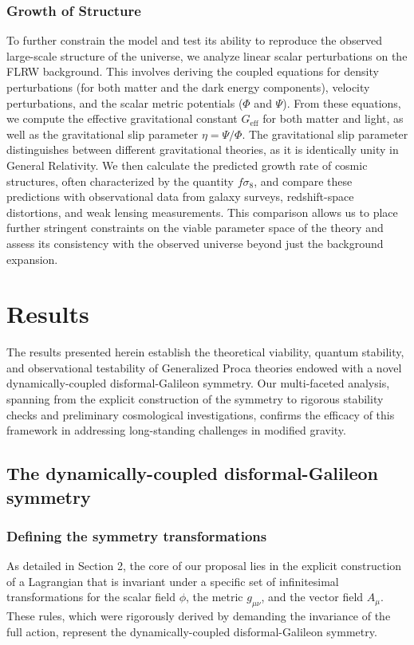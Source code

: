 \documentclass[twocolumn]{aastex631}
\begin{document}
\subsubsection{Growth of Structure}
To further constrain the model and test its ability to reproduce the observed large-scale structure of the universe, we analyze linear scalar perturbations on the FLRW background. This involves deriving the coupled equations for density perturbations (for both matter and the dark energy components), velocity perturbations, and the scalar metric potentials ($\Phi$ and $\Psi$). From these equations, we compute the effective gravitational constant $G_{\text{eff}}$ for both matter and light, as well as the gravitational slip parameter $\eta = \Psi/\Phi$. The gravitational slip parameter distinguishes between different gravitational theories, as it is identically unity in General Relativity. We then calculate the predicted growth rate of cosmic structures, often characterized by the quantity $f\sigma_8$, and compare these predictions with observational data from galaxy surveys, redshift-space distortions, and weak lensing measurements. This comparison allows us to place further stringent constraints on the viable parameter space of the theory and assess its consistency with the observed universe beyond just the background expansion.

\section{Results}
\label{sec:results}
The results presented herein establish the theoretical viability, quantum stability, and observational testability of Generalized Proca theories endowed with a novel dynamically-coupled disformal-Galileon symmetry. Our multi-faceted analysis, spanning from the explicit construction of the symmetry to rigorous stability checks and preliminary cosmological investigations, confirms the efficacy of this framework in addressing long-standing challenges in modified gravity.

\subsection{The dynamically-coupled disformal-Galileon symmetry}

\subsubsection{Defining the symmetry transformations}
As detailed in Section 2, the core of our proposal lies in the explicit construction of a Lagrangian that is invariant under a specific set of infinitesimal transformations for the scalar field $\phi$, the metric $g_{\mu\nu}$, and the vector field $A_\mu$. These rules, which were rigorously derived by demanding the invariance of the full action, represent the dynamically-coupled disformal-Galileon symmetry.
\end{document}
